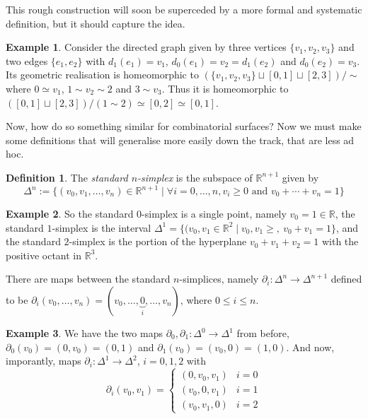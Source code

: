 \documentclass{tufte-handout}
\def\RR{\mathbb{R}}
\theoremstyle{definition}
\newtheorem{definition}{Definition}
\newtheorem{example}{Example}
\begin{document}
This rough construction will soon be superceded by a more formal and systematic definition, 
but it should capture the idea.

\begin{example}\label{eg:join_interval_geom_real}
Consider the directed graph given by three vertices $\{v_1,v_2,v_3\}$ and two edges 
$\{e_1,e_2\}$ with $d_1(e_1) = v_1$, $d_0(e_1) = v_2 = d_1(e_2)$ and $d_0(e_2) = v_3$. Its 
geometric realisation is homeomorphic to $(\{v_1,v_2,v_3\} \sqcup [0,1] \sqcup [2,3])/\!\sim$
where $0\simeq v_1$, $1\sim v_2 \sim 2$ and $3\sim v_3$. Thus it is homeomorphic to 
$([0,1]\sqcup [2,3])/(1\sim 2) \simeq [0,2] \simeq [0,1]$.
\end{example}

Now, how do so something similar for combinatorial surfaces? Now we must make some definitions
that will generalise more easily down the track, that are less ad hoc.

\begin{definition}
The \emph{standard $n$-simplex} is the subspace of $\RR^{n+1}$ given by
\[
	\Delta^n := \{(v_0,v_1,\ldots,v_n) \in \RR^{n+1} \mid \forall i=0,\ldots,n, v_i\geq 0
			\text{ and } v_0+\cdots+v_n = 1\}
\]
\end{definition}

\begin{example}
So  the standard $0$-simplex is a single point, namely $v_0=1\in \RR$, the standard $1$-simplex
is the interval $\Delta^1 = \{(v_0,v_1\in \RR^2\mid v_0,v_1 \geq,\ v_0+v_1 = 1\}$, and the 
standard $2$-simplex is the portion of the hyperplane $v_0+v_1+v_2 = 1$ with the positive
octant in $\RR^3$. 
\end{example}

There are maps between the standard $n$-simplices, namely $\partial_i\colon \Delta^n \to \Delta^{n+1}$
defined to be $\partial_i(v_0,\ldots,v_n) = (v_0,\ldots,\underbrace{0}_{i},\ldots,v_n)$, where
$0\leq i \leq n$.

\begin{example}
We have the two maps $\partial_0,\partial_1\colon \Delta^0 \to \Delta^1$ from before, $\partial_0(v_0) = (0,v_0) = (0,1)$ 
and $\partial_1(v_0) = (v_0,0) = (1,0)$. And now, imporantly, maps $\partial_i\colon \Delta^1\to \Delta^2$, $i=0,1,2$ with
\[
\partial_i(v_0,v_1) =\begin{cases}
(0,v_0,v_1) & i=0\\
(v_0,0,v_1) & i=1\\
(v_0,v_1,0) & i=2
\end{cases}
\]
\end{example}
\end{document}
